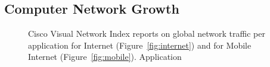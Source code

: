\subsection{Computer Network Growth} \label{sec:intro:net_evolution}

\begin{figure}[ht] 
  \centering 
  \caption{Cisco Visual Network Index reports on global network traffic per
    application for Internet (Figure~\ref{fig:internet}) and for Mobile
    Internet (Figure~\ref{fig:mobile}). Application } 
  \label{fig:internet_applications} 
\end{figure}

